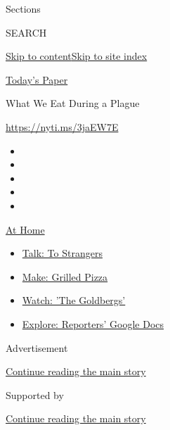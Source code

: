 Sections

SEARCH

\protect\hyperlink{site-content}{Skip to
content}\protect\hyperlink{site-index}{Skip to site index}

\href{https://myaccount.nytimes.com/auth/login?response_type=cookie\&client_id=vi}{}

\href{https://www.nytimes.com/section/todayspaper}{Today's Paper}

What We Eat During a Plague

\url{https://nyti.ms/3jaEW7E}

\begin{itemize}
\item
\item
\item
\item
\item
\end{itemize}

\href{https://www.nytimes.com/spotlight/at-home?action=click\&pgtype=Article\&state=default\&region=TOP_BANNER\&context=at_home_menu}{At
Home}

\begin{itemize}
\tightlist
\item
  \href{https://www.nytimes.com/2020/08/03/well/family/the-benefits-of-talking-to-strangers.html?action=click\&pgtype=Article\&state=default\&region=TOP_BANNER\&context=at_home_menu}{Talk:
  To Strangers}
\item
  \href{https://www.nytimes.com/2020/08/01/at-home/coronavirus-make-pizza-on-a-grill.html?action=click\&pgtype=Article\&state=default\&region=TOP_BANNER\&context=at_home_menu}{Make:
  Grilled Pizza}
\item
  \href{https://www.nytimes.com/2020/07/31/arts/television/goldbergs-abc-stream.html?action=click\&pgtype=Article\&state=default\&region=TOP_BANNER\&context=at_home_menu}{Watch:
  'The Goldbergs'}
\item
  \href{https://www.nytimes.com/interactive/2020/at-home/even-more-reporters-editors-diaries-lists-recommendations.html?action=click\&pgtype=Article\&state=default\&region=TOP_BANNER\&context=at_home_menu}{Explore:
  Reporters' Google Docs}
\end{itemize}

Advertisement

\protect\hyperlink{after-top}{Continue reading the main story}

Supported by

\protect\hyperlink{after-sponsor}{Continue reading the main story}

